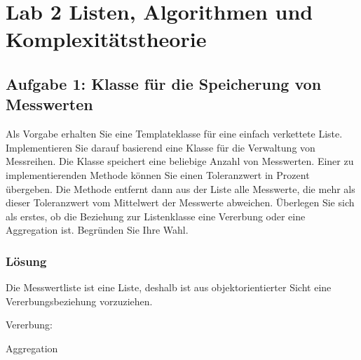 \section{Lab 2 Listen, Algorithmen und Komplexitätstheorie}
\subsection{Aufgabe 1: Klasse für die Speicherung von Messwerten}
Als Vorgabe erhalten Sie eine Templateklasse für eine einfach verkettete Liste. Implementieren Sie darauf basierend eine Klasse für die Verwaltung von Messreihen. Die Klasse speichert eine beliebige Anzahl von Messwerten. Einer zu implementierenden Methode können Sie einen Toleranzwert in Prozent übergeben. Die Methode entfernt dann aus der Liste alle Messwerte, die mehr als dieser Toleranzwert vom Mittelwert der Messwerte abweichen.
Überlegen Sie sich als erstes, ob die Beziehung zur Listenklasse eine Vererbung oder eine Aggregation ist. Begründen Sie Ihre Wahl.

\subsubsection{Lösung}
Die Messwertliste ist eine Liste, deshalb ist aus objektorientierter Sicht eine Vererbungsbeziehung vorzuziehen.

\large{Vererbung:}

\noindent\makebox[\linewidth]{\rule{\paperwidth}{0.4pt}}

\noindent\makebox[\linewidth]{\rule{\paperwidth}{0.4pt}}

\noindent\makebox[\linewidth]{\rule{\paperwidth}{0.4pt}}


\large{Aggregation}

\noindent\makebox[\linewidth]{\rule{\paperwidth}{0.4pt}}

\noindent\makebox[\linewidth]{\rule{\paperwidth}{0.4pt}}

\noindent\makebox[\linewidth]{\rule{\paperwidth}{0.4pt}}


